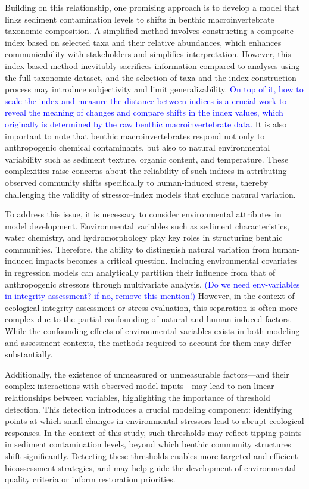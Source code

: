 Building on this relationship, one promising approach is to develop a model that links sediment contamination 
levels to shifts in benthic macroinvertebrate taxonomic composition. A simplified method involves constructing a 
composite index based on selected taxa and their relative abundances, which enhances communicability with stakeholders
and simplifies interpretation. However, this index-based method inevitably sacrifices information compared to analyses
using the full taxonomic dataset, and the selection of taxa and the index construction process may introduce
subjectivity and limit generalizability\cite{Desrosiers2020}. 
\textcolor{blue}{On top of it, how to scale the index and measure the distance between indices is a
crucial work to reveal the meaning of changes and compare shifts in the index values, which originally 
is determined by the raw benthic macroinvertebrate data.}
It is also important to note that benthic macroinvertebrates respond not
only to anthropogenic chemical contaminants, but also to natural environmental variability such as sediment texture, 
organic content, and temperature. These complexities raise concerns about the reliability of such indices in attributing
observed community shifts specifically to human-induced stress, thereby challenging the validity of stressor–index models that exclude natural variation.

To address this issue, it is necessary to consider environmental attributes in model development. 
Environmental variables such as sediment characteristics, water chemistry, and hydromorphology play key roles
in structuring benthic communities. 
Therefore, the ability to distinguish natural variation from human-induced
impacts becomes a critical question. 
Including environmental covariates in regression models can analytically partition
their influence from that of anthropogenic stressors through multivariate analysis.
\textcolor{blue}{(Do we need env-variables in integrity assessment? if no, remove this mention!)}
However, in the context of ecological
integrity assessment or stress evaluation, this separation is often more complex due to the partial confounding
of natural and human-induced factors. While the confounding effects of environmental variables exists in both
modeling and assessment contexts, the methods required to account for them may differ substantially.

Additionally, the existence of unmeasured or unmeasurable factors—and their complex interactions 
with observed model inputs—may lead to non-linear relationships between variables, 
highlighting the importance of threshold detection. 
This detection introduces a crucial modeling component: identifying points at which small 
changes in environmental stressors lead to abrupt ecological responses. 
In the context of this study, such thresholds may reflect tipping points in sediment contamination 
levels, beyond which benthic community structures shift significantly. 
Detecting these thresholds enables more targeted and efficient bioassessment strategies, 
and may help guide the development of environmental quality criteria or inform restoration priorities.

